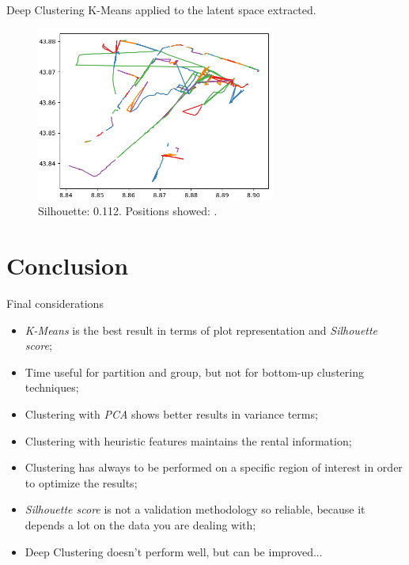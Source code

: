 \documentclass{beamer}
\begin{document}
\begin{frame}{Deep Clustering}
	K-Means applied to the latent space extracted.
	\begin{figure}[bt]
		\centering
		\includegraphics[width=0.7\textwidth]{dl-clustering}
		\caption{Silhouette: 0.112. Positions showed: .}
		\label{fig:dl-clustering}
	\end{figure}
\end{frame}

\section{Conclusion}
\begin{frame}{Final considerations}
\begin{itemize}
	\item \textit{K-Means} is the best result in terms of plot representation and \textit{Silhouette score};
	\item Time useful for partition and group, but not for bottom-up clustering techniques;
	\item Clustering with \textit{PCA} shows better results in variance terms;
	\item Clustering with heuristic features maintains the rental information;
	\item Clustering has always to be performed on a specific region of interest in order to optimize the results;
	\item \textit{Silhouette score} is not a validation methodology so reliable, because it depends a lot on the data you are dealing with;
	\item Deep Clustering doesn't perform well, but can be improved...
\end{itemize}
\end{frame}
\end{document}
